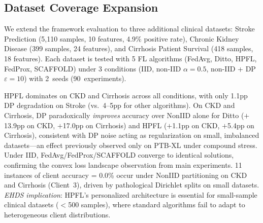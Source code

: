 \documentclass[conference,a4paper]{IEEEtran}
\begin{document}
\subsection{Dataset Coverage Expansion}
\label{sec:dataset_coverage}

We extend the framework evaluation to three additional clinical datasets: Stroke Prediction (5,110 samples, 10 features, 4.9\% positive rate), Chronic Kidney Disease (399 samples, 24 features), and Cirrhosis Patient Survival (418 samples, 18 features). Each dataset is tested with 5 FL algorithms (FedAvg, Ditto, HPFL, FedProx, SCAFFOLD) under 3 conditions (IID, non-IID $\alpha{=}0.5$, non-IID + DP $\varepsilon{=}10$) with 2~seeds (90~experiments).

\begin{table}[htbp]
\centering
\caption{Dataset Coverage Expansion: Mean Accuracy (\%) Across Seeds}
\label{tab:dataset_coverage}

\vspace{1mm}
\footnotesize{HPFL dominates on CKD and Cirrhosis across all conditions, with only 1.1pp DP degradation on Stroke (vs.\ 4--5pp for other algorithms). On CKD and Cirrhosis, DP paradoxically \textit{improves} accuracy over NonIID alone for Ditto ($+$13.9pp on CKD, $+$17.0pp on Cirrhosis) and HPFL ($+$1.1pp on CKD, $+$5.4pp on Cirrhosis), consistent with DP noise acting as regularization on small, imbalanced datasets---an effect previously observed only on PTB-XL under compound stress. Under IID, FedAvg/FedProx/SCAFFOLD converge to identical solutions, confirming the convex loss landscape observation from main experiments. 11 instances of client accuracy = 0.0\% occur under NonIID partitioning on CKD and Cirrhosis (Client~3), driven by pathological Dirichlet splits on small datasets. \textit{EHDS implication}: HPFL's personalized architecture is essential for small-sample clinical datasets ($<$500 samples), where standard algorithms fail to adapt to heterogeneous client distributions.}
\end{table}
\end{document}
